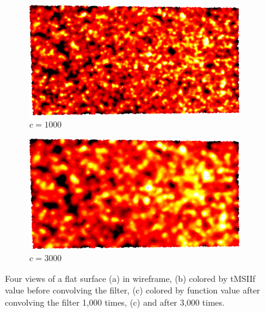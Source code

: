 \begin{figure}[ht]
	\bigskip
	\begin{subfigure}[b]{0.49\linewidth}
		\includegraphics[width=\linewidth]
		{data/acquired_meshes/ILATO_1A_SM2066-HE5-60_070214_merged_GMO_r1_n4_v256_funcvals_1000iter.png}
		\caption{$c=1000$}\label{fig:ILATO.c}
	\end{subfigure}
	\begin{subfigure}[b]{0.49\linewidth}
		\includegraphics[width=\linewidth]
		{data/acquired_meshes/ILATO_1A_SM2066-HE5-60_070214_merged_GMO_r1_n4_v256_funcvals_3000iter.png}
		\caption{$c=3000$}\label{fig:ILATO.d}
	\end{subfigure}
	\caption[Four Views of the Flat Surface from ILATO]{Four views of a flat surface (a) in wireframe, (b) colored by \gls{tMSIIf} value before convolving the filter, (c) colored by function value after convolving the filter 1,000 times, (c) and after 3,000 times.}
	\label{fig:ILATO}
\end{figure}
